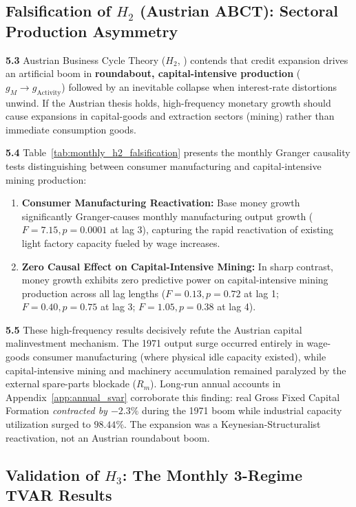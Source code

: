 \subsection{Falsification of \texorpdfstring{$H_2$}{H2} (Austrian ABCT): Sectoral Production Asymmetry}
\label{sec:results_gate2}

\textbf{5.3} Austrian Business Cycle Theory ($H_2$, \citealp{EspinosaVejar2025}) contends that credit expansion drives an artificial boom in \textbf{roundabout, capital-intensive production} ($g_M \to g_{\text{Activity}}$) followed by an inevitable collapse when interest-rate distortions unwind. If the Austrian thesis holds, high-frequency monetary growth should cause expansions in capital-goods and extraction sectors (mining) rather than immediate consumption goods.



\textbf{5.4} Table~\ref{tab:monthly_h2_falsification} presents the monthly Granger causality tests distinguishing between consumer manufacturing and capital-intensive mining production:
\begin{enumerate}[leftmargin=2em]
	\item \textbf{Consumer Manufacturing Reactivation:} Base money growth significantly Granger-causes monthly manufacturing output growth ($F = 7.15, p = 0.0001$ at lag 3), capturing the rapid reactivation of existing light factory capacity fueled by wage increases.
	\item \textbf{Zero Causal Effect on Capital-Intensive Mining:} In sharp contrast, money growth exhibits zero predictive power on capital-intensive mining production across all lag lengths ($F = 0.13, p = 0.72$ at lag 1; $F = 0.40, p = 0.75$ at lag 3; $F = 1.05, p = 0.38$ at lag 4).
\end{enumerate}
\textbf{5.5} These high-frequency results decisively refute the Austrian capital malinvestment mechanism. The 1971 output surge occurred entirely in wage-goods consumer manufacturing (where physical idle capacity existed), while capital-intensive mining and machinery accumulation remained paralyzed by the external spare-parts blockade ($R_m$). Long-run annual accounts in Appendix~\ref{app:annual_svar} corroborate this finding: real Gross Fixed Capital Formation \emph{contracted by $-2.3\%$} during the 1971 boom while industrial capacity utilization surged to $98.44\%$. The expansion was a Keynesian-Structuralist reactivation, not an Austrian roundabout boom.

\subsection{Validation of \texorpdfstring{$H_3$}{H3}: The Monthly 3-Regime TVAR Results}
\label{sec:results_gate3}

